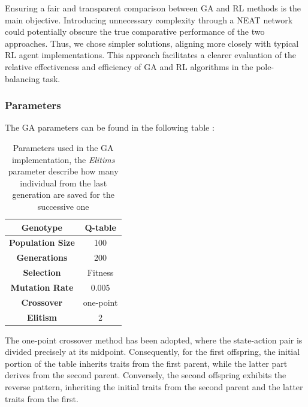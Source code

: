 Ensuring a fair and transparent comparison between GA and RL methods is the main objective. Introducing unnecessary complexity through a NEAT network could potentially obscure the true comparative performance of the two approaches. Thus, we chose simpler solutions, aligning more closely with typical RL agent implementations. This approach facilitates a clearer evaluation of the relative effectiveness and efficiency of GA and RL algorithms in the pole-balancing task.

\subsubsection{Parameters}
The GA parameters can be found in the following table :
\begin{table}[htb]%
	\centering
	\begin{tabular}{|S|S|} 		%
		
		\hline
		{\textbf{Genotype}} &  {Q-table} \\
		\hline
		{\textbf{Population Size}} & {100} \\
		\hline
		{\textbf{Generations}} & {200} \\
		\hline
		{\textbf{Selection}}  & {Fitness} \\
		\hline
		{\textbf{Mutation Rate}} & {0.005} \\
		\hline
		{\textbf{Crossover}}& {one-point} \\
		\hline
		{\textbf{Elitism}}&  {2}  \\
		\hline

	\end{tabular}
	\caption{Parameters used in the GA implementation, the \textit{Elitims} parameter describe how many individual from the last generation are saved for the successive one}
	\label{tab:GA_parameters}
\end{table}

The one-point crossover method has been adopted, where the state-action pair is divided precisely at its midpoint. Consequently, for the first offspring, the initial portion of the table inherits traits from the first parent, while the latter part derives from the second parent. Conversely, the second offspring exhibits the reverse pattern, inheriting the initial traits from the second parent and the latter traits from the first.

